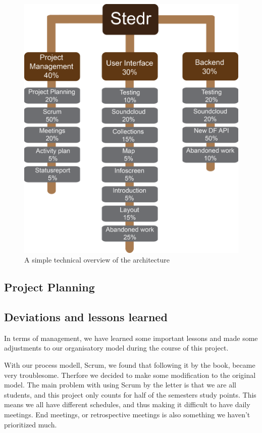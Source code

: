 \begin{figure}[h!]
\begin{center}
\includegraphics[scale=0.6]{WBS}
\caption{A simple technical overview of the architecture}
\end{center}
\end{figure}

\subsection{Project Planning}


\subsection{Deviations and lessons learned}
In terms of management, we have learned some important lessons and made some adjustments to our organisatory model during the course of this project. 

With our process modell, Scrum, we found that following it by the book, became very troublesome. Therfore we decided to make some modification to the original model. The main problem with using Scrum by the letter is that we are all students, and this project only counts for half of the semesters study points. This means we all have different schedules, and thus making it difficult to have daily meetings. End meetings, or retrospective meetings is also something we haven’t prioritized much.

